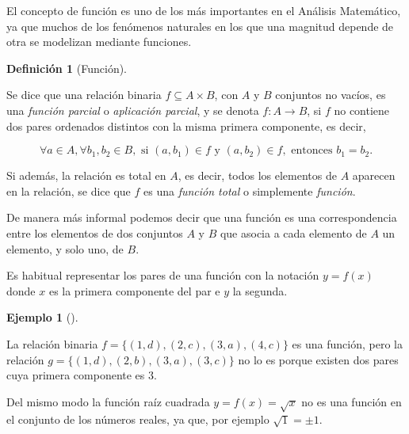 \documentclass[
  a4paper,
]{scrreport}
\theoremstyle{definition}
\newtheorem{definition}{Definición}[chapter]
\theoremstyle{plain}
\theoremstyle{plain}
\theoremstyle{definition}
\theoremstyle{definition}
\newtheorem{example}{Ejemplo}[chapter]
\theoremstyle{plain}
\theoremstyle{remark}
\begin{document}
El concepto de función es uno de los más importantes en el Análisis
Matemático, ya que muchos de los fenómenos naturales en los que una
magnitud depende de otra se modelizan mediante funciones.

\begin{definition}[Función]\protect\hypertarget{def-funcion}{}\label{def-funcion}

Se dice que una relación binaria \(f \subseteq A \times B\), con \(A\) y
\(B\) conjuntos no vacíos, es una \emph{función parcial} o
\emph{aplicación parcial}, y se denota \(f:A\rightarrow B\), si \(f\) no
contiene dos pares ordenados distintos con la misma primera componente,
es decir,

\[
\forall a \in A, \forall b_1, b_2 \in B, \mbox{ si } (a,b_1) \in f \mbox{ y } (a,b_2) \in f, \mbox{ entonces } b_1 = b_2.
\]

Si además, la relación es total en \(A\), es decir, todos los elementos
de \(A\) aparecen en la relación, se dice que \(f\) es una \emph{función
total} o simplemente \emph{función}.

\end{definition}

De manera más informal podemos decir que una función es una
correspondencia entre los elementos de dos conjuntos \(A\) y \(B\) que
asocia a cada elemento de \(A\) un elemento, y solo uno, de \(B\).

Es habitual representar los pares de una función con la notación
\(y=f(x)\) donde \(x\) es la primera componente del par e \(y\) la
segunda.

\begin{example}[]\protect\hypertarget{exm-funcion}{}\label{exm-funcion}

La relación binaria \(f=\{(1,d), (2,c), (3,a), (4,c)\}\) es una función,
pero la relación \(g=\{(1,d), (2,b), (3,a), (3,c)\}\) no lo es porque
existen dos pares cuya primera componente es \(3\).

Del mismo modo la función raíz cuadrada \(y=f(x)=\sqrt{x}\) no es una
función en el conjunto de los números reales, ya que, por ejemplo
\(\sqrt{1}=\pm 1\).

\end{example}
\end{document}
